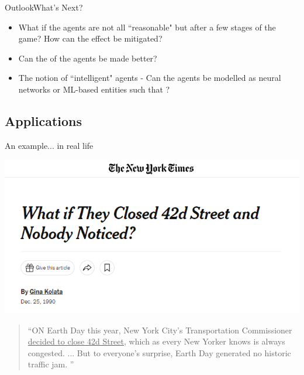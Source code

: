 \documentclass[aspectratio=169]{beamer}
\begin{document}
\begin{frame}{Outlook}{What's Next?}
\begin{itemize}
    \item<+-> What if the agents are not all ``reasonable" but  after a few stages of the game? How can the effect be mitigated?
    \item<+-> Can the  of the agents be made better?
    \item<+-> The notion of ``intelligent" agents - Can the agents be modelled as neural networks or ML-based entities such that ?
\end{itemize}
\end{frame}

\subsection{Applications}

\begin{frame}{An example}{... in real life}
\centering

    \includegraphics[width=0.6\linewidth]{images/42d street NY Times.png}

\bigskip

\begin{quote}
\small
    ``ON Earth Day this year, New York City's Transportation Commissioner \underline{decided to close 42d Street}, which as every New Yorker knows is always congested. ... But to everyone's surprise, Earth Day generated no historic traffic jam. '' \cite{nytimes}
\end{quote}
    
\end{frame}

\end{document}
